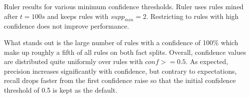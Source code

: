\begin{table}
    \makebox[\textwidth][c]{
        
    }
    \caption{Ruler results for various minimum confidence thresholds. Ruler uses rules mined after $t = 100s$ and keeps rules with $supp_{min} = 2$. Restricting to rules with high confidence does not improve performance.}
    \label{tab:5_experiments/4_ruler/3_rule_quality/conf_results}
\end{table}

What stands out is the large number of rules with a confidence of 100\% which make up roughly a fifth of all rules on both fact splits. Overall, confidence values are distributed quite uniformly over rules with $conf >= 0.5$. As expected, precision increases significantly with confidence, but contrary to expectations, recall drops faster from the first confidence raise so that the initial confidence threshold of 0.5 is kept as the default.
